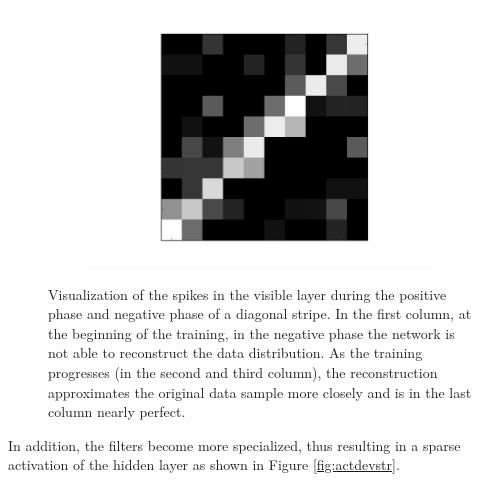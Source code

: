 \begin{figure}[h!]
\begin{subfigure}{.25\textwidth}
  		\label{fig:sub1}
	\end{subfigure}%
	\begin{subfigure}{.25\textwidth}
  		\centering
  		\includegraphics[width=0.8\linewidth]{imgs/reconst/00008.png}
  		\label{fig:sub1}
	\end{subfigure}%
	\caption[Visualization of the spikes in the visible layer during the positive phase and negative phase of a diagonal stripe.]{Visualization of the spikes in the visible layer during the positive phase and negative phase of a diagonal stripe. In the first column, at the beginning of the training, in the negative phase the network is not able to reconstruct the data distribution. As the training progresses (in the second and third column), the reconstruction approximates the original data sample more closely and is in the last column nearly perfect.}
	\label{fig:posnegstrec}
\end{figure}

In addition, the filters become more specialized, thus resulting in a sparse activation of the hidden layer as shown in Figure \ref{fig:actdevstr}.  

